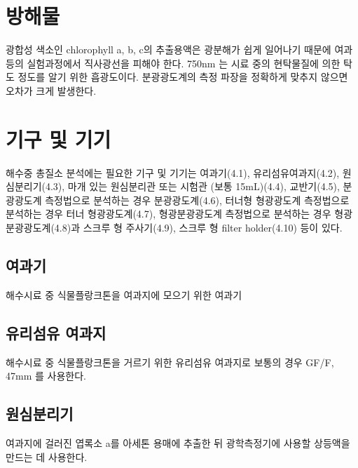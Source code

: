 \documentclass[
]{book}
\begin{document}
\hypertarget{uxbc29uxd574uxbb3c-4}{%
\section{방해물}\label{uxbc29uxd574uxbb3c-4}}

광합성 색소인 chlorophyll a, b, c의 추출용액은 광분해가 쉽게 일어나기 때문에 여과 등의 실험과정에서 직사광선을 피해야 한다. 750nm 는 시료 중의 현탁물질에 의한 탁도 정도를 알기 위한 흡광도이다. 분광광도계의 측정 파장을 정확하게 맞추지 않으면 오차가 크게 발생한다.

\hypertarget{uxae30uxad6c-uxbc0f-uxae30uxae30-4}{%
\section{기구 및 기기}\label{uxae30uxad6c-uxbc0f-uxae30uxae30-4}}

해수중 총질소 분석에는 필요한 기구 및 기기는 여과기(4.1), 유리섬유여과지(4.2), 원심분리기(4.3), 마개 있는 원심분리관 또는 시험관 (보통 15mL)(4.4), 교반기(4.5), 분광광도계 측정법으로 분석하는 경우 분광광도계(4.6), 터너형 형광광도계 측정법으로 분석하는 경우 터너 형광광도계(4.7), 형광분광광도계 측정법으로 분석하는 경우 형광분광광도계(4.8)과 스크루 형 주사기(4.9), 스크루 형 filter holder(4.10) 등이 있다.

\hypertarget{uxc5ecuxacfcuxae30}{%
\subsection{여과기}\label{uxc5ecuxacfcuxae30}}

해수시료 중 식물플랑크톤을 여과지에 모으기 위한 여과기

\hypertarget{uxc720uxb9acuxc12cuxc720-uxc5ecuxacfcuxc9c0}{%
\subsection{유리섬유 여과지}\label{uxc720uxb9acuxc12cuxc720-uxc5ecuxacfcuxc9c0}}

해수시료 중 식물플랑크톤을 거르기 위한 유리섬유 여과지로 보통의 경우 GF/F, 47mm 를 사용한다.

\hypertarget{uxc6d0uxc2ecuxbd84uxb9acuxae30}{%
\subsection{원심분리기}\label{uxc6d0uxc2ecuxbd84uxb9acuxae30}}

여과지에 걸러진 엽록소 a를 아세톤 용매에 추출한 뒤 광학측정기에 사용할 상등액을 만드는 데 사용한다.
\end{document}
